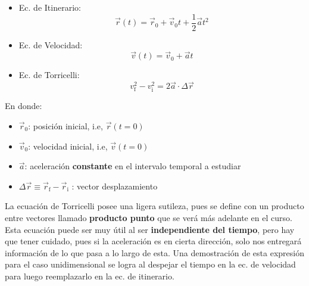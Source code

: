 \documentclass[letterpaper,11pt]{article}
\newcommand\warning[1][2ex]{%
  \renewcommand\stacktype{L}%
  \scaleto{\stackon[1.3pt]{\color{red}$\triangle$}{\tiny !}}{#1}%
}
\begin{document}
\begin{multicols}{2}
    \begin{center}
        \begin{tcolorbox}[colback=white, colframe=blue, width=0.45\textwidth]
            \begin{itemize}
                \item Ec. de Itinerario: \[\vec{r}(t) = \vec{r}_0 + \vec{v}_0 t + \frac{1}{2} \vec{a} t^2\]
                \item Ec. de Velocidad: \[\vec{v}(t) = \vec{v}_0 + \vec{a}t\]
                \item Ec. de Torricelli: \[v_{\text{f}}^2 - v_{\text{i}}^2 = 2 \vec{a}\cdot\Delta\vec{r}\]
            \end{itemize}
        \end{tcolorbox}
    \end{center}
    \columnbreak
    En donde:
    \begin{itemize}
    \setlength\itemsep{0.3em}
        \item $\vec{r}_0$: posición inicial, i.e, $\vec{r}(t=0)$
        \item $\vec{v}_0$: velocidad inicial, i.e, $\vec{v}(t=0)$
        \item $\vec{a}$: aceleración \textbf{constante} en el intervalo temporal a estudiar
        \item $\Delta\vec{r} \equiv \vec{r}_{\text{f}} - \vec{r}_{\text{i}}$ : vector desplazamiento
    \end{itemize}
\end{multicols}

\noindent \warning[3ex] La ecuación de Torricelli posee una ligera sutileza, pues se define con un producto entre vectores llamado \textbf{producto punto} que se verá más adelante en el curso. \newline
Esta ecuación puede ser muy útil al ser \textbf{independiente del tiempo}, pero hay que tener cuidado, pues si la aceleración es en cierta dirección, solo nos entregará información de lo que pasa a lo largo de esta. \newline Una demostración de esta expresión para el caso unidimensional se logra al despejar el tiempo en la ec. de velocidad para luego reemplazarlo en la ec. de itinerario.
\end{document}
